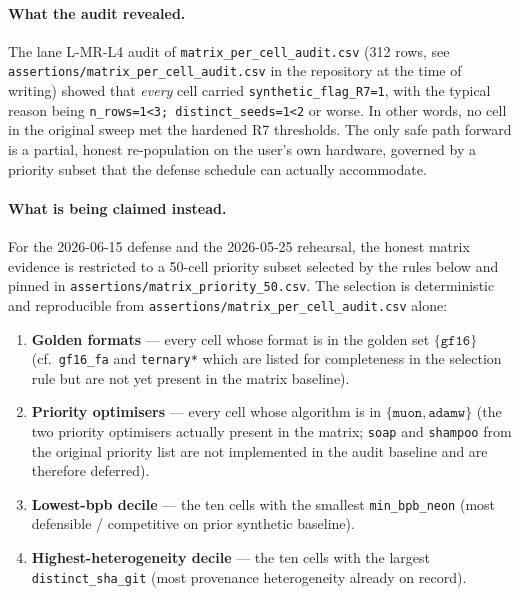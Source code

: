 \paragraph{What the audit revealed.}
The lane L-MR-L4 audit of \texttt{matrix\_per\_cell\_audit.csv}
(312 rows, see \texttt{assertions/matrix\_per\_cell\_audit.csv} in
the repository at the time of writing) showed that
\emph{every} cell carried \texttt{synthetic\_flag\_R7=1}, with the
typical reason being \texttt{n\_rows=1<3; distinct\_seeds=1<2}
or worse. In other words, no cell in the original sweep met the
hardened R7 thresholds. The only safe path forward is a partial,
honest re-population on the user's own hardware, governed by a
priority subset that the defense schedule can actually accommodate.

\paragraph{What is being claimed instead.}
For the 2026-06-15 defense and the 2026-05-25 rehearsal, the
honest matrix evidence is restricted to a 50-cell priority subset
selected by the rules below and pinned in
\texttt{assertions/matrix\_priority\_50.csv}. The selection is
deterministic and reproducible from
\texttt{assertions/matrix\_per\_cell\_audit.csv} alone:

\begin{enumerate}
  \item \textbf{Golden formats} --- every cell whose format is in
        the golden set $\{\texttt{gf16}\}$ (cf.\ \texttt{gf16\_fa}
        and \texttt{ternary*} which are listed for completeness in
        the selection rule but are not yet present in the matrix
        baseline).
  \item \textbf{Priority optimisers} --- every cell whose algorithm
        is in $\{\texttt{muon}, \texttt{adamw}\}$ (the two priority
        optimisers actually present in the matrix; \texttt{soap}
        and \texttt{shampoo} from the original priority list are
        not implemented in the audit baseline and are therefore
        deferred).
  \item \textbf{Lowest-bpb decile} --- the ten cells with the
        smallest \texttt{min\_bpb\_neon} (most defensible /
        competitive on prior synthetic baseline).
  \item \textbf{Highest-heterogeneity decile} --- the ten cells
        with the largest \texttt{distinct\_sha\_git} (most
        provenance heterogeneity already on record).
\end{enumerate}

